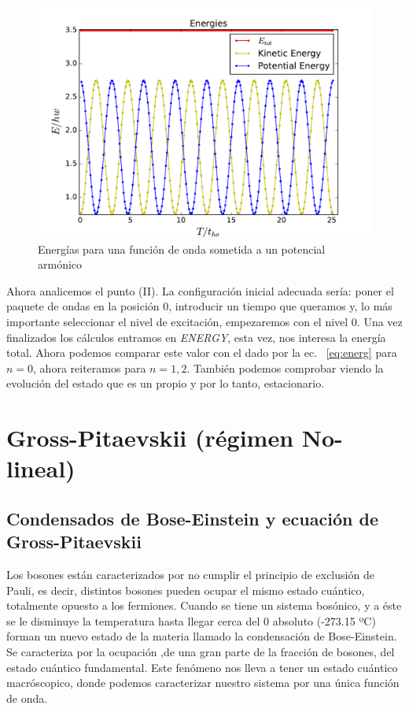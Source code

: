 \documentclass[12pt]{article}
\begin{document}
\begin{figure}[tb]
	\centering
	\includegraphics[width=0.9\linewidth]{harm.pdf}
	\caption{Energ\'ias para una funci\'on de onda sometida a un potencial arm\'onico}
	\label{Fig:harm}
\end{figure}
Ahora analicemos el punto (II). La configuraci\'on inicial adecuada ser\'ia: poner el paquete de ondas en la posici\'on 0, introducir un tiempo que queramos y, lo m\'as importante seleccionar el nivel de excitaci\'on, empezaremos con el nivel 0. Una vez finalizados los c\'alculos entramos en \textit{ENERGY}, esta vez, nos interesa la energ\'ia total. Ahora podemos comparar este valor con el dado por la ec. ~\eqref{eq:energ} para $n=0$, ahora reiteramos para $n=1,2$. Tambi\'en podemos comprobar viendo la evoluci\'on del estado que es un propio y por lo tanto, estacionario.

\section{Gross-Pitaevskii (r\'egimen No-lineal)}

\subsection{Condensados de Bose-Einstein y ecuaci\'on de Gross-Pitaevskii}
Los bosones est\'an caracterizados por no cumplir el principio de exclusi\'on de Pauli, es decir, distintos bosones pueden ocupar el mismo estado cu\'antico, totalmente opuesto a los fermiones. Cuando se tiene un sistema bos\'onico, y a \'este se le disminuye la temperatura hasta llegar cerca del 0 absoluto (-273.15 ºC) forman un nuevo estado de la materia llamado la condensaci\'on de Bose-Einstein. Se caracteriza por la ocupaci\'on ,de una gran parte de la fracci\'on de bosones, del estado cu\'antico fundamental. Este fen\'omeno nos lleva a tener un estado cu\'antico macr\'oscopico, donde podemos caracterizar nuestro sistema por una \'unica funci\'on de onda.
\\
\end{document}
